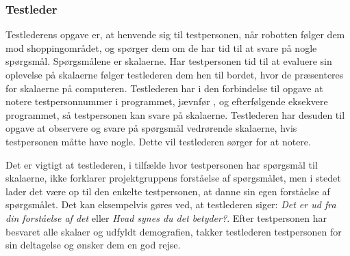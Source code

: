 \subsubsection*{Testleder}
%
Testlederens opgave er, at henvende sig til testpersonen, når robotten følger dem mod shoppingområdet, og spørger dem om de har tid til at svare på nogle spørgsmål. Spørgsmålene er skalaerne. Har testpersonen tid til at evaluere sin oplevelse på skalaerne følger testlederen dem hen til bordet, hvor de præsenteres for skalaerne på computeren. Testlederen har i den forbindelse til opgave at notere testpersonnummer i programmet, jævnfør , og efterfølgende eksekvere programmet, så testpersonen kan svare på skalaerne. Testlederen har desuden til opgave at observere og svare på spørgsmål vedrørende skalaerne, hvis testpersonen måtte have nogle. Dette vil testlederen sørger for at notere. 

Det er vigtigt at testlederen, i tilfælde hvor testpersonen har spørgsmål til skalaerne, ikke forklarer projektgruppens forståelse af spørgsmålet, men i stedet lader det være op til den enkelte testpersonen, at danne sin egen forståelse af spørgsmålet. Det kan eksempelvis gøres ved, at testlederen siger: \textit{Det er ud fra din forståelse af det} eller \textit{Hvad synes du det betyder?}. Efter testpersonen har besvaret alle skalaer og udfyldt demografien, takker testlederen testpersonen for sin deltagelse og ønsker dem en god rejse.
\newpage
 

